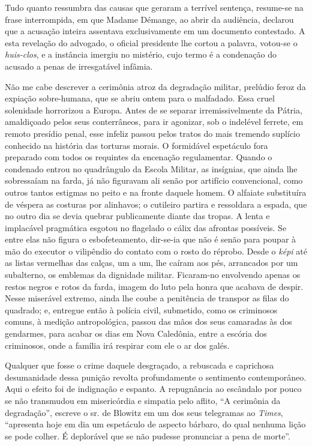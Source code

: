 Tudo quanto ressumbra das causas que geraram a terrível sentença,
resume-se na frase interrompida, em que Madame Démange, ao abrir da
audiência, declarou que a acusação inteira assentava exclusivamente em
um documento contestado. A esta revelação do advogado, o oficial
presidente lhe cortou a palavra, votou-se o \textit{huis-clos}, 
e a instância imergiu no mistério, cujo termo é a condenação do acusado a penas de
irresgatável infâmia.

Não me cabe descrever a cerimônia atroz da degradação militar, prelúdio
feroz da expiação sobre-humana, que se abriu ontem para o malfadado.
Essa cruel solenidade horrorizou a Europa. Antes de se separar
irremissivelmente da Pátria, amaldiçoado pelos seus conterrâneos, para
ir agonizar, sob o indelével ferrete, em remoto presídio penal, esse
infeliz passou pelos tratos do mais tremendo suplício conhecido na
história das torturas morais. O formidável espetáculo fora preparado
com todos os requintes da encenação regulamentar. Quando o condenado
entrou no quadrângulo da Escola Militar, as insígnias, que ainda lhe
sobressaíam na farda, já não figuravam ali senão por artifício
convencional, como outros tantos estigmas no peito e na fronte daquele
homem. O alfaiate substituíra de véspera as costuras por alinhavos; o
cutileiro partira e ressoldara a espada, que no outro dia se devia
quebrar publicamente diante das tropas. A lenta e implacável pragmática
esgotou no flagelado o cálix das afrontas possíveis. Se entre elas não
figura o esbofeteamento, dir-se-ia que não é senão para poupar à
mão do executor o vilipêndio do contato com o rosto do réprobo. Desde
o \textit{képi} até as listas vermelhas das calças, um a um, lhe caíram aos pés,
arrancados por um subalterno, os emblemas da dignidade militar.
Ficaram-no envolvendo apenas os restos negros e rotos da farda,
imagem do luto pela honra que acabava de despir. Nesse miserável
extremo, ainda lhe coube a penitência de transpor as filas do quadrado;
e, entregue então à polícia civil, submetido, como os criminosos
comuns, à medição antropológica, passou das mãos dos seus camaradas às
dos gendarmes, para acabar os dias em Nova Caledônia, entre a escória
dos criminosos, onde a família irá respirar com ele o ar dos galés.

Qualquer que fosse o crime daquele desgraçado, a rebuscada e caprichosa
desumanidade dessa punição revolta profundamente o  
sentimento contemporâneo. Aqui o efeito foi de indignação e espanto. A
repugnância ao escândalo por pouco se não transmudou em misericórdia e
simpatia pelo aflito, ``A cerimônia da
degradação'', escreve o sr. de Blowitz em um dos seus
telegramas ao \textit{Times}, ``apresenta hoje em dia um espetáculo
de aspecto bárbaro, do qual nenhuma lição se pode colher. É deplorável
que se não pudesse pronunciar a pena de morte''.

